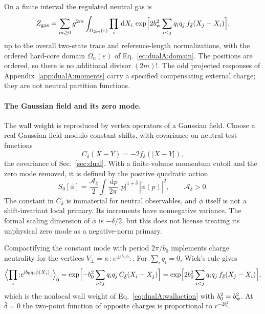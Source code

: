 \documentclass[11pt,a4paper]{article}
\numberwithin{equation}{section}
\newcommand{\dd}{\,\mathrm d}
\newcommand{\db}{\bar\delta}
\begin{document}
On a finite interval the regulated neutral gas is
\begin{equation}
 Z_{\rm gas}=\sum_{m\ge0}g^{2m}\int_{\Omega_{2m}(\varepsilon)}\prod_i\dd X_i\,
 \exp\Bigl[2b_{\rm w}^2\sum_{i<j}q_iq_j\,f_{\db}(X_j-X_i)\Bigr],
\end{equation}
up to the overall two-state trace and reference-length normalizations, with the ordered hard-core domain
$\Omega_n(\varepsilon)$ of Eq.~\eqref{eq:dualA:domain}. The positions are ordered, so there is no additional divisor
$(2m)!$. The odd projected responses of Appendix~\ref{app:dualA:moments} carry a specified compensating external
charge; they are not neutral partition functions.

\paragraph{The Gaussian field and its zero mode.} The wall weight is reproduced by vertex operators of a Gaussian
field. Choose a real Gaussian field modulo constant shifts, with covariance on neutral test functions
\begin{equation}
 C_{\db}(X-Y)=-2f_{\db}(|X-Y|),
 \label{eq:dualA:covariance}
\end{equation}
the covariance of Sec.~\ref{sec:dual}. With a finite-volume momentum cutoff and the zero mode removed, it is defined
by the positive quadratic action
\begin{equation}
 S_0[\phi]=\frac{\mathcal A_{\db}}{2}\int\frac{\dd p}{2\pi}\,|p|^{1+\db}\,|\widetilde\phi(p)|^2,
 \qquad\mathcal A_{\db}>0.
\end{equation}
The constant in $C_{\db}$ is immaterial for neutral observables, and $\phi$ itself is not a shift-invariant local
primary. Its increments have nonnegative variance. The formal scaling dimension of $\phi$ is $-\db/2$, but this does
not license treating its unphysical zero mode as a negative-norm primary.

Compactifying the constant mode with period $2\pi/b_0$ implements charge neutrality for the vertices
$V_\pm=\kappa\,{:}e^{\pm\mathrm ib_0\phi}{:}$. For $\sum_iq_i=0$, Wick's rule gives
\begin{equation}
 \Bigl\langle\prod_i{:}e^{\mathrm ib_0q_i\phi(X_i)}{:}\Bigr\rangle_0
 =\exp\Bigl[-b_0^2\sum_{i<j}q_iq_j\,C_{\db}(X_i-X_j)\Bigr]
 =\exp\Bigl[2b_0^2\sum_{i<j}q_iq_j\,f_{\db}(X_j-X_i)\Bigr],
 \label{eq:dualA:vertexgas}
\end{equation}
which is the nonlocal wall weight of Eq.~\eqref{eq:dualA:wallaction} with $b_0^2=b_{\rm w}^2$. At $\db=0$ the
two-point function of opposite charges is proportional to $r^{-2b_0^2}$.
\end{document}
